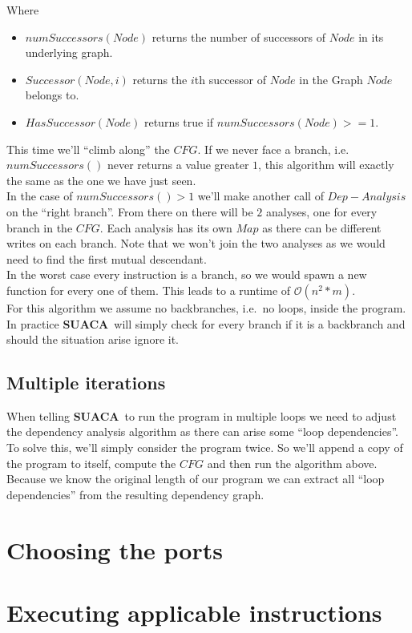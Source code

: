 \documentclass[a4paper,12pt,titlepage, twoside]{report}
\newcommand{\suaca}{\textbf{SUACA}}
\begin{document}
Where
\begin{itemize}
    \item $numSuccessors(Node)$ returns the number of successors of $Node$ in its underlying graph.
    \item $Successor(Node, i)$ returns the $i$th successor of $Node$ in the Graph $Node$ belongs to.
    \item $HasSuccessor(Node)$ returns true if $numSuccessors(Node) >= 1$.
\end{itemize}

This time we'll ``climb along'' the $CFG$. If we never face a branch, i.e.\ $numSuccessors()$ never returns a value greater $1$, this algorithm will exactly the same as the one we have just seen.\\
In the case of $numSuccessors() > 1$ we'll make another call of $Dep-Analysis$ on the ``right branch''. From there on there will be $2$ analyses, one for every branch in the $CFG$. Each analysis has its own $Map$ as there can be different writes on each branch. Note that we won't join the two analyses as we would need to find the first mutual descendant.\\

In the worst case every instruction is a branch, so we would spawn a new function for every one of them. This leads to a runtime of $\mathcal{O}(n^2*m)$.\\

For this algorithm we assume no backbranches, i.e.\ no loops, inside the program. In practice \suaca\ will simply check for every branch if it is a backbranch and should the situation arise ignore it.


\subsection{Multiple iterations}

When telling \suaca\ to run the program in multiple loops we need to adjust the dependency analysis algorithm as there can arise some ``loop dependencies''. To solve this, we'll simply consider the program twice. So we'll append a copy of the program to itself, compute the $CFG$ and then run the algorithm above. Because we know the original length of our program we can extract all ``loop dependencies'' from the resulting dependency graph.

\section{Choosing the ports}
\label{sec:chooseport}

\section{Executing applicable instructions}


{\small }
\end{document}
